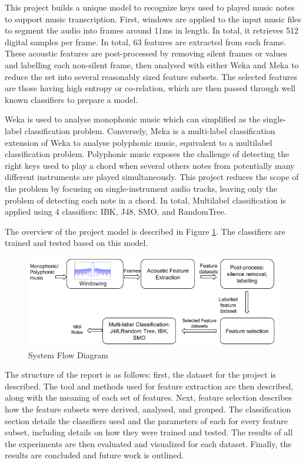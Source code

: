 \documentclass{article}
\begin{document}
This project builds a unique model to recognize keys used to played music notes to support music transcription. First, windows are applied to the input music files to segment the audio into frames around 11ms in length. In total, it retrieves 512 digital samples per frame. In total, 63 features are extracted from each frame. These acoustic features are post-processed by removing silent frames or values and labelling each non-silent frame, then analysed with either Weka\cite{Holmes1994-kg} and Meka\cite{Read2012-sh} to reduce the set into several reasonably sized feature subsets.  The selected features are those having high entropy or co-relation, which are then passed through well known classifiers to prepare a model. 

Weka is used to analyse monophonic music which can simplified as the single-label classification problem. Conversely, Meka is a multi-label classification extension of Weka to  analyse polyphonic music, equivalent to a multilabel classification problem. Polyphonic music exposes the challenge of detecting the right keys used to play a chord when several others notes from potentially many different instruments are played simultaneously. This project reduces the scope of the problem by focusing on single-instrument audio tracks, leaving only the problem of detecting each note in a chord. In total, Multilabel classification\cite{Herrera2016-ep} is applied using 4 classifiers: IBK\cite{Aha1991-ir}, J48\cite{Ross_Quinlan2014-rg}, SMO\cite{Platt1999-iq}, and RandomTree\cite{Dugan2015-fn}. 

The overview of the project model is described in Figure \ref{figure1}. The classifiers are trained and tested based on this model.

\begin{figure}[h]
\includegraphics[scale=.4]{overview}
 \caption{System Flow Diagram}
\label{figure1}
\end{figure}

The structure of the report is as follows: first, the dataset for the project is described. The tool and methods used for feature extraction are then described, along with the meaning of each set of features. Next, feature selection describes how the feature subsets were derived, analysed, and grouped. The classification section details the classifiers used and the parameters of each for every feature subset, including details on how they were trained and tested. The results of all the experiments are then evaluated and visualized for each dataset. Finally, the results are concluded and future work is outlined.
\end{document}
